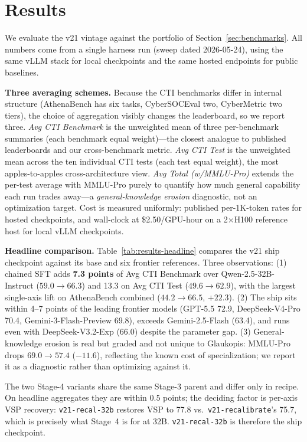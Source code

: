 \documentclass[conference]{IEEEtran}
\providecommand{\hfid}[1]{{\small\nolinkurl{#1}}}
\begin{document}
\section{Results}
\label{sec:results}

We evaluate the v21 vintage against the portfolio of Section~\ref{sec:benchmarks}. All numbers come from a single harness run (sweep dated 2026-05-24), using the same vLLM stack for local checkpoints and the same hosted endpoints for public baselines.

\textbf{Three averaging schemes.} Because the CTI benchmarks differ in internal structure (AthenaBench has six tasks, CyberSOCEval two, CyberMetric two tiers), the choice of aggregation visibly changes the leaderboard, so we report three. \emph{Avg CTI Benchmark} is the unweighted mean of three per-benchmark summaries (each benchmark equal weight)---the closest analogue to published leaderboards and our cross-benchmark metric. \emph{Avg CTI Test} is the unweighted mean across the ten individual CTI tests (each test equal weight), the most apples-to-apples cross-architecture view. \emph{Avg Total (w/MMLU-Pro)} extends the per-test average with MMLU-Pro purely to quantify how much general capability each run trades away---a \textit{general-knowledge erosion} diagnostic, not an optimization target. Cost is measured uniformly: published per-1K-token rates for hosted checkpoints, and wall-clock at \$2.50/GPU-hour on a 2$\times$H100 reference host for local vLLM checkpoints.

\textbf{Headline comparison.} Table~\ref{tab:results-headline} compares the v21 ship checkpoint against its base and six frontier references. Three observations: (1) chained SFT adds \textbf{7.3 points} of Avg CTI Benchmark over Qwen-2.5-32B-Instruct ($59.0\to66.3$) and 13.3 on Avg CTI Test ($49.6\to62.9$), with the largest single-axis lift on AthenaBench combined ($44.2\to66.5$, $+22.3$). (2) The ship sits within 4--7 points of the leading frontier models (GPT-5.5 72.9, DeepSeek-V4-Pro 70.4, Gemini-3-Flash-Preview 69.8), exceeds Gemini-2.5-Flash (63.4), and runs even with DeepSeek-V3.2-Exp (66.0) despite the parameter gap. (3) General-knowledge erosion is real but graded and not unique to Glaukopis: MMLU-Pro drops $69.0\to57.4$ ($-11.6$), reflecting the known cost of specialization; we report it as a diagnostic rather than optimizing against it.

The two Stage-4 variants share the same Stage-3 parent and differ only in recipe. On headline aggregates they are within 0.5 points; the deciding factor is per-axis VSP recovery: \hfid{v21-recal-32b} restores VSP to 77.8 vs.\ \hfid{v21-recalibrate}'s 75.7, which is precisely what Stage~4 is for at 32B. \hfid{v21-recal-32b} is therefore the ship checkpoint.
\end{document}
